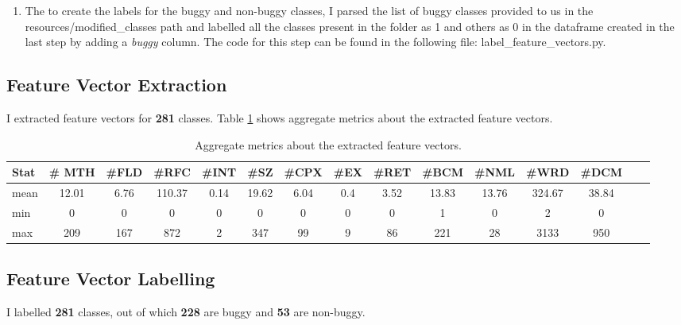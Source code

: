 \documentclass{article}
\newcommand\templateInstruction[1]{
\hl{#1}
}
\begin{document}
\begin{enumerate}
    \item The to create the labels for the buggy and non-buggy classes, 
    I parsed the list of buggy classes provided to us in the resources\//modified\_classes path 
    and labelled all the classes present in the folder as 1 and others as 0 in the dataframe created in the last step by adding a \textit{buggy} column.
    The code for this step can be found in the following file: label\_feature\_vectors.py.
\end{enumerate}

\subsection{Feature Vector Extraction}
I extracted feature vectors for \textbf{281} classes. 
Table \ref{tab:agg_metrics} shows aggregate metrics about the extracted feature vectors.

\begin{table}[]
    \centering
    \begin{adjustbox}{width=1.25\textwidth}
    \begin{tabular}{lcccccccccccccc}
        \hline
        \textbf{Stat} &\textbf{\# MTH} & \textbf{\#FLD} & \textbf{\#RFC} & \textbf{\#INT} & \textbf{\#SZ} & \textbf{\#CPX} & \textbf{\#EX} & \textbf{\#RET} & \textbf{\#BCM} & \textbf{\#NML} & \textbf{\#WRD} & \textbf{\#DCM}\\
        \hline\hline
        {mean} & {12.01} & {6.76} & {110.37} & {0.14} & {19.62} & {6.04} & {0.4} & {3.52} & {13.83} & {13.76} & {324.67} & {38.84}\\
        {min} & {0} & {0} & {0} & {0} & {0} & {0} & {0} & {0} & {1} & {0} & {2} & {0}\\
        {max} & {209} & {167} & {872} & {2} & {347} & {99} & {9} & {86} & {221} & {28} & {3133} & {950}\\
        \hline
    \end{tabular}
    \end{adjustbox}
    \caption{Aggregate metrics about the extracted feature vectors.}
    \label{tab:agg_metrics}
\end{table}


\subsection{Feature Vector Labelling}
I labelled \textbf{281} classes, out of which \textbf{228} are buggy and \textbf{53} are non-buggy.
\end{document}
